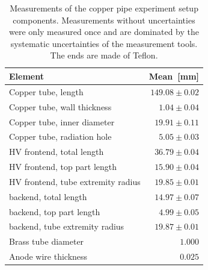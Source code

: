 \begin{table}[htb!]
	\begin{tabularx}{\linewidth}{p{4.5cm}r}
		\textbf{Element} & \textbf{Mean}~{[}mm{]}          \\ \hline
		Copper tube, length            & $149.08 \pm 0.02$ \\
		Copper tube, wall thickness    & $1.04 \pm 0.04$  \\
		Copper tube, inner diameter    & $19.91 \pm 0.11$  \\
		Copper tube, radiation hole    & $5.05 \pm 0.03$  \\
		HV frontend,  total length         & $36.79 \pm 0.04$  \\
		HV frontend, top part length       & $15.90 \pm 0.04$  \\
		HV frontend, tube extremity radius & $19.85 \pm 0.01$  \\
		backend, total length             & $14.97 \pm 0.07$  \\
		backend, top part length          & $4.99 \pm 0.05$  \\
		backend, tube extremity radius    & $19.87 \pm 0.01$  \\
		Brass tube diameter            & $1.000$           \\
		Anode wire thickness           & $0.025$           \\ \hline
	\end{tabularx}
\caption{Measurements of the copper pipe experiment setup components. Measurements without uncertainties were only measured once and are dominated by the systematic uncertainties of the measurement tools. The ends are made of Teflon.}
\label{Tab:coppercan_sizes}
\end{table}




















